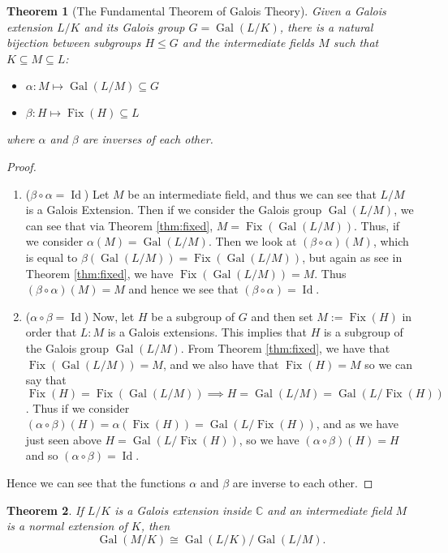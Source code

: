 \documentclass[12pt]{article}
\newtheorem{theorem}{Theorem}
\theoremstyle{definition}
\newcommand{\Gal}{\operatorname{Gal}}
\newcommand{\Fix}{\operatorname{Fix}}
\newcommand{\Id}{\operatorname{Id}}
\newcommand{\C}{\mathbb C}
\begin{document}
\begin{theorem}[The Fundamental Theorem of Galois Theory] \label{thm:fundamental-theorem} Given a Galois extension $L/K$ and its Galois group $G = \Gal(L/K)$, there is a natural bijection between subgroups $H\leq G$ and the intermediate fields $M$ such that $K \subseteq M \subseteq L$:

\begin{itemize}
    \item $\alpha:M \mapsto \Gal(L/M) \subseteq G$
    \item $\beta:H \mapsto \Fix(H) \subseteq L$
\end{itemize}
where $\alpha$ and $\beta$ are inverses of each other.
\end{theorem}
\begin{proof}
\begin{enumerate}[label=(\roman*)]

 \item ($\beta \circ \alpha = \Id$) Let $M$ be an intermediate field, and thus we can see that $L/M$ is a Galois Extension. Then if we consider the Galois group $\Gal(L/M)$, we can see that via Theorem \ref{thm:fixed}, $M = \Fix(\Gal(L/M))$. Thus, if we consider $\alpha(M) = \Gal(L/M)$. Then we look at $(\beta \circ \alpha)(M)$, which is equal to $\beta(\Gal(L/M)) = \Fix(\Gal(L/M))$, but again as see in Theorem \ref{thm:fixed}, we have $\Fix(\Gal(L/M)) = M$. Thus $(\beta \circ \alpha)(M) = M$ and hence we see that $(\beta \circ \alpha) = \Id$.

 \item ($\alpha \circ \beta = \Id$) Now, let $H$ be a subgroup of $G$ and then set $M :=\Fix(H)$ in order that $L:M$ is a Galois extensions. This implies that $H$ is a subgroup of the Galois group $\Gal(L/M)$. From Theorem \ref{thm:fixed}, we have that $\Fix(\Gal(L/M))=M$, and we also have that $\Fix(H) = M$ so we can say that $\Fix(H)=\Fix(\Gal(L/M)) \implies H = \Gal(L/M) = \Gal(L/\Fix(H))$. Thus if we consider $(\alpha \circ \beta)(H) = \alpha(\Fix(H)) = \Gal(L/\Fix(H))$, and as we have just seen above $H = \Gal(L/\Fix(H))$, so we have $(\alpha \circ \beta)(H) = H$ and so $(\alpha \circ \beta) = \Id$.
\end{enumerate}
Hence we can see that the functions $\alpha$ and $\beta$ are inverse to each other.
\end{proof}

\begin{theorem} \label{thm:correspondence-quotient}
    If $L / K$ is a Galois extension inside $\C$ and an intermediate field $M$ is a normal extension of $K$, then 
    $$\Gal(M / K) \cong \Gal(L / K) / \Gal(L / M). $$
\end{theorem}
\end{document}
